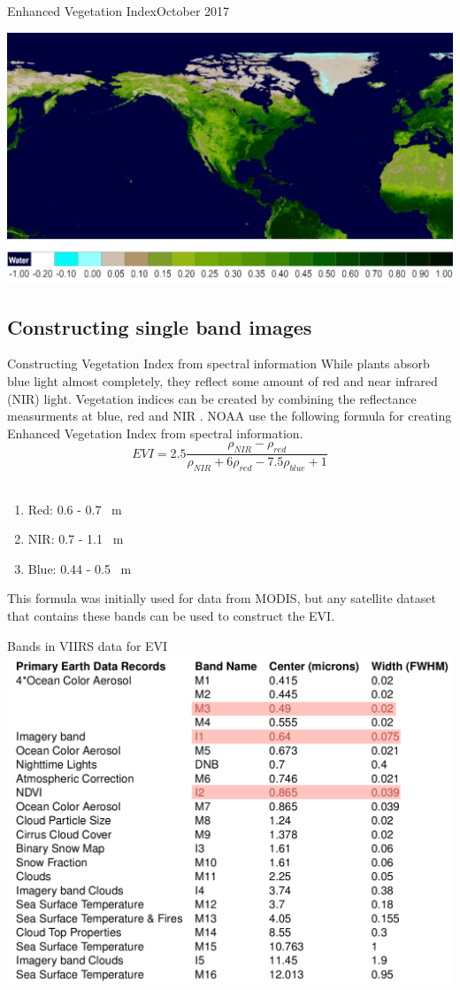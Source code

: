 \documentclass[aspectratio=169]{beamer} %
\begin{document}
\begin{frame}{Enhanced Vegetation Index}{October 2017}
  \begin{center}
    \includegraphics[width = .7\linewidth]{ndvi.png}
  \end{center}
\end{frame}

\subsection{Constructing single band images}

\begin{frame}{Constructing Vegetation Index from spectral information}
  While plants absorb blue light almost completely, they reflect some amount of red and near infrared (NIR) light. 
  Vegetation indices can be created by combining the reflectance measurments at blue, red and NIR . NOAA use the following formula for creating Enhanced Vegetation Index from spectral information.
  \begin{equation}
    EVI = 2.5 \frac{\rho_{NIR} - \rho_{red}}{\rho_{NIR} + 6 \rho_{red} - 7.5 \rho_{blue}+ 1}
  \end{equation}
  \\
  \begin{enumerate}
    \item Red:  0.6 - 0.7 ~{\textmu}m
    \item NIR:  0.7 - 1.1 ~{\textmu}m
    \item Blue: 0.44 - 0.5 ~{\textmu}m
  \end{enumerate} 
  This formula was initially used for data from MODIS, but any satellite dataset that contains these bands can be used to construct the EVI. 
  
\end{frame}

\begin{frame}{Bands in VIIRS data for EVI}
  \includegraphics[width = .7\linewidth]{ndvi_bands.png}
\end{frame}
\end{document}
